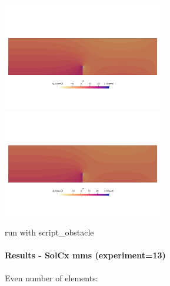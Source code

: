 \begin{center}
\includegraphics[width=7cm]{python_codes/fieldstone_78/results/flow_over_obstacle/p0}
\includegraphics[width=7cm]{python_codes/fieldstone_78/results/flow_over_obstacle/p1}
\end{center}

run with script\_obstacle
 
\newpage
\paragraph{Results - SolCx mms (experiment=13)}

Even number of elements:

